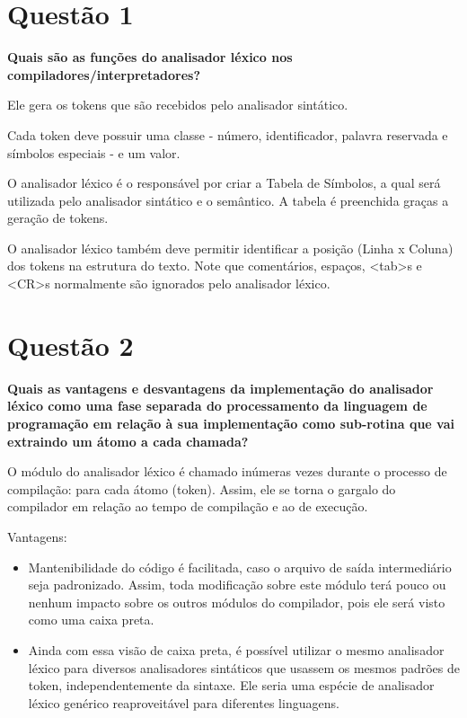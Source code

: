 
\section{Questão 1}

\textbf{Quais são as funções do analisador léxico nos compiladores/interpretadores?}

Ele gera os tokens que são recebidos pelo analisador sintático.

Cada token deve possuir uma classe  - número, identificador, palavra reservada e símbolos especiais - e um valor.

O analisador léxico é o responsável por criar a Tabela de Símbolos, a qual será utilizada pelo analisador sintático e o semântico. A tabela é preenchida graças a geração de tokens.

O analisador léxico também deve permitir identificar a posição (Linha x Coluna) dos tokens na estrutura do texto. Note que comentários, espaços, <tab>s e <CR>s normalmente são ignorados pelo analisador léxico.
 
\section{Questão 2}           
\textbf{Quais as vantagens e desvantagens da implementação do analisador léxico como uma fase separada do processamento da linguagem de programação em relação à sua implementação como sub-rotina que vai extraindo um átomo a cada chamada?}

O módulo do analisador léxico é chamado inúmeras vezes durante o processo de compilação: para cada átomo (token). Assim, ele se torna o gargalo do compilador em relação ao tempo de compilação e ao de execução.

Vantagens:
\begin{itemize}
	\item Mantenibilidade do código é facilitada, caso o arquivo de saída intermediário seja padronizado. Assim, toda modificação sobre este módulo terá pouco ou nenhum impacto sobre os outros módulos do compilador, pois ele será visto como uma caixa preta. 
	\item Ainda com essa visão de caixa preta, é possível utilizar o mesmo analisador léxico para diversos analisadores sintáticos que usassem os mesmos padrões de token, independentemente da sintaxe. Ele seria uma espécie de analisador léxico genérico reaproveitável para diferentes linguagens.
\end{itemize}


